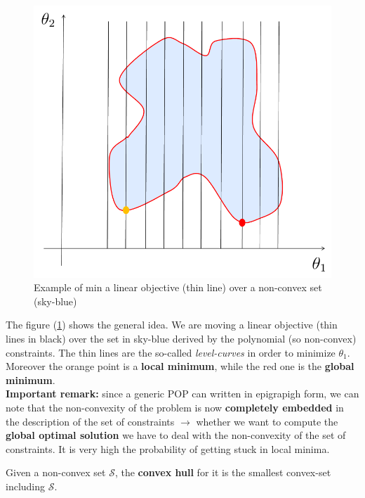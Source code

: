\begin{figure}[h] \label{fig:non-convex}
    \centering
    \includegraphics[scale=0.5]{img/nonconvex.png}
    \caption{Example of min a linear objective (thin line) over a non-convex set (sky-blue)}
\end{figure}

The figure (\ref{fig:non-convex}) shows the general idea. We are moving a linear objective (thin lines in black) over the set in sky-blue derived by the polynomial (so non-convex) constraints. The thin lines are the so-called \textit{level-curves} in order to minimize $\theta_1$. Moreover the orange point is a \textbf{local minimum}, while the red one is the \textbf{global minimum}.\\

\noindent
\textbf{\color{red}Important remark:} since a generic POP can written in epigrapigh form, we can note that the non-convexity of  the problem is now \textbf{completely embedded} in the description of the set of constraints $\to$ whether we want to compute the \textbf{global optimal solution} we have to deal with the non-convexity of the set of constraints. It is very high the probability of getting stuck in local minima.\\

\begin{definition} Given a non-convex set $\mathcal{S}$, the \textbf{convex hull} for it is the smallest  convex-set including $\mathcal{S}$. 
\end{definition}

